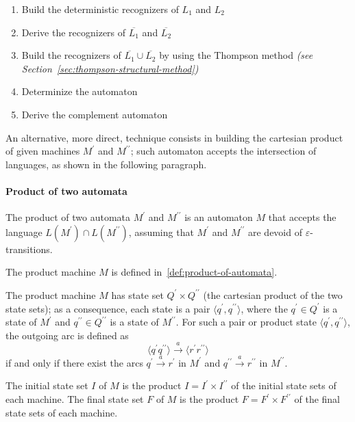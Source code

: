 \documentclass[english]{article}
\begin{document}
\begin{enumerate}
  \item Build the deterministic recognizers of \(L_1\) and \(L_2\)
  \item Derive the recognizers of \(\overline{L_1}\) and \(\overline{L_2}\)
  \item Build the recognizers of \(\overline{L_1} \cup \overline{L_2}\) by using the Thompson method \textit{(see Section~\ref{sec:thompson-structural-method})}
  \item Determinize the automaton
  \item Derive the complement automaton
\end{enumerate}

An alternative, more direct, technique consists in building the cartesian product of given machines \(M^\prime\) and \(M^{\prime\prime}\);
such automaton accepts the intersection of languages, as shown in the following paragraph.

\paragraph{Product of two automata}

The product of two automata \(M^\prime\) and \(M^{\prime\prime}\) is an automaton \(M\) that accepts the language \(L(M^\prime) \cap L(M^{\prime\prime})\), assuming that \(M^\prime\) and \(M^{\prime\prime}\) are devoid of \(\varepsilon\)-transitions.

The product machine \(M\) is defined in~\ref{def:product-of-automata}.

\begin{definition}
  \label{def:product-of-automata}
  The product machine \(M\) has state set \(Q^\prime \times Q^{\prime\prime}\) (the cartesian product of the two state sets);
  as a consequence, each state is a pair \(\langle q^\prime,q^{\prime\prime} \rangle\), where the \(q^\prime \in Q^\prime\) is a state of \(M^\prime\) and \(q^{\prime\prime} \in Q^{\prime\prime}\) is a state of \(M^{\prime\prime}\).
  For such a pair or product state \(\langle q^\prime,q^{\prime\prime} \rangle\), the outgoing arc is defined as
  \[ \langle q^\prime q^{\prime\prime} \rangle \xrightarrow{a} \langle r^\prime r^{\prime\prime} \rangle \]
  if and only if there exist the arcs \(q^\prime \xrightarrow{a} r^\prime\) in \(M^\prime\) and \(q^{\prime\prime} \xrightarrow{a} r^{\prime\prime}\) in \(M^{\prime\prime}\).
\end{definition}

The initial state set \(I\) of \(M\) is the product \(I = I^\prime \times I^{\prime\prime}\) of the initial state sets of each machine.
The final state set \(F\) of \(M\) is the product \(F = F^\prime \times F^{\prime\prime}\) of the final state sets of each machine.
\end{document}
